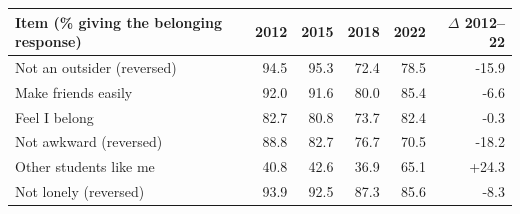 \begin{tabular}{@{}lrrrrr@{}}
\toprule
Item (\% giving the belonging response) & 2012 & 2015 & 2018 & 2022 & $\Delta$ 2012--22 \\
\midrule
Not an outsider (reversed) & 94.5 & 95.3 & 72.4 & 78.5 & -15.9 \\
Make friends easily & 92.0 & 91.6 & 80.0 & 85.4 & -6.6 \\
Feel I belong & 82.7 & 80.8 & 73.7 & 82.4 & -0.3 \\
Not awkward (reversed) & 88.8 & 82.7 & 76.7 & 70.5 & -18.2 \\
Other students like me & 40.8 & 42.6 & 36.9 & 65.1 & +24.3 \\
Not lonely (reversed) & 93.9 & 92.5 & 87.3 & 85.6 & -8.3 \\
\bottomrule
\end{tabular}
